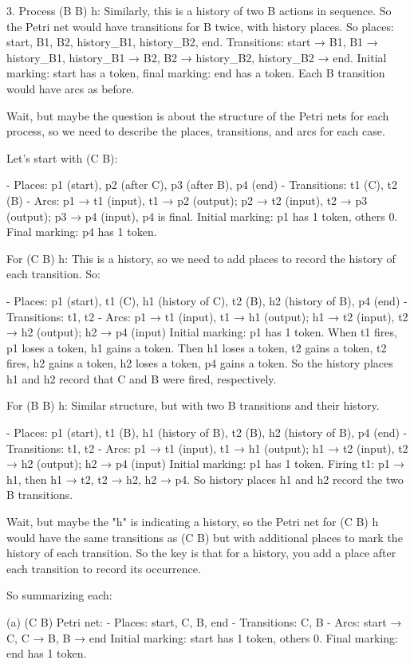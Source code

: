 3. Process (B B) h: Similarly, this is a history of two B actions in sequence. So the Petri net would have transitions for B twice, with history places. So places: start, B1, B2, history_B1, history_B2, end. Transitions: start → B1, B1 → history_B1, history_B1 → B2, B2 → history_B2, history_B2 → end. Initial marking: start has a token, final marking: end has a token. Each B transition would have arcs as before.

Wait, but maybe the question is about the structure of the Petri nets for each process, so we need to describe the places, transitions, and arcs for each case.

Let's start with (C B):

- Places: p1 (start), p2 (after C), p3 (after B), p4 (end)
- Transitions: t1 (C), t2 (B)
- Arcs: p1 → t1 (input), t1 → p2 (output); p2 → t2 (input), t2 → p3 (output); p3 → p4 (input), p4 is final.
Initial marking: p1 has 1 token, others 0. Final marking: p4 has 1 token.

For (C B) h: This is a history, so we need to add places to record the history of each transition. So:

- Places: p1 (start), t1 (C), h1 (history of C), t2 (B), h2 (history of B), p4 (end)
- Transitions: t1, t2
- Arcs: p1 → t1 (input), t1 → h1 (output); h1 → t2 (input), t2 → h2 (output); h2 → p4 (input)
Initial marking: p1 has 1 token. When t1 fires, p1 loses a token, h1 gains a token. Then h1 loses a token, t2 gains a token, t2 fires, h2 gains a token, h2 loses a token, p4 gains a token. So the history places h1 and h2 record that C and B were fired, respectively.

For (B B) h: Similar structure, but with two B transitions and their history.

- Places: p1 (start), t1 (B), h1 (history of B), t2 (B), h2 (history of B), p4 (end)
- Transitions: t1, t2
- Arcs: p1 → t1 (input), t1 → h1 (output); h1 → t2 (input), t2 → h2 (output); h2 → p4 (input)
Initial marking: p1 has 1 token. Firing t1: p1 → h1, then h1 → t2, t2 → h2, h2 → p4. So history places h1 and h2 record the two B transitions.

Wait, but maybe the "h" is indicating a history, so the Petri net for (C B) h would have the same transitions as (C B) but with additional places to mark the history of each transition. So the key is that for a history, you add a place after each transition to record its occurrence.

So summarizing each:

(a) (C B) Petri net:
- Places: start, C, B, end
- Transitions: C, B
- Arcs: start → C, C → B, B → end
Initial marking: start has 1 token, others 0. Final marking: end has 1 token.


